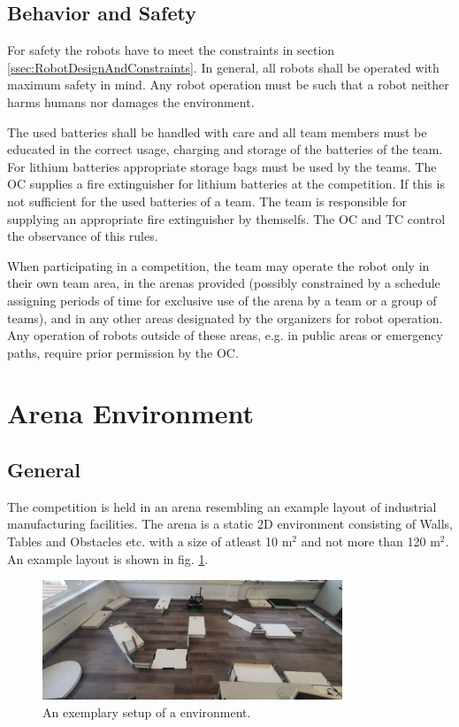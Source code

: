 \subsection{Behavior and Safety} \label{ssec:RobotBehaviorAndSafety}
For safety the robots have to meet the constraints in section \ref{ssec:RobotDesignAndConstraints}. In general, all robots shall be operated with maximum safety in mind. Any robot operation must be such that a robot neither harms humans nor damages the environment. \par 
The used batteries shall be handled with care and all team members must be educated in the correct usage, charging and storage of the batteries of the team. For lithium batteries appropriate storage bags must be used by the teams. The OC supplies a fire extinguisher for lithium batteries at the competition. If this is not sufficient for the used batteries of a team. The team is responsible for supplying an appropriate fire extinguisher by themselfs. The OC and TC control the observance of this rules.

When participating in a competition, the team may operate the robot only in their own team area, in the arenas provided (possibly constrained by a schedule assigning periods of time for exclusive use of the arena by a team or a group of teams), and in any other areas designated by the organizers for robot operation. Any operation of robots outside of these areas, e.g. in public areas or emergency paths, require prior permission by the OC.




\clearpage

\section{Arena Environment}
\label{sec:ArenaDesign}

\subsection{General}
\label{ssec:ArenaGeneral}


The competition is held in an arena resembling an example layout of industrial manufacturing facilities. 
The arena is a static 2D environment consisting of Walls, Tables and Obstacles etc. with a size of atleast 10 m$^2$ and not more than 120 m$^2$. 
An example layout is shown in fig. \ref{fig:arena_example}.

\begin{figure} [h!]
\centering
\includegraphics[width= 0.8\textwidth ]{./images/general_rules/arena_example.jpg}
\caption{An exemplary setup of a \RCAW environment.}
\label{fig:arena_example}
\end{figure}

